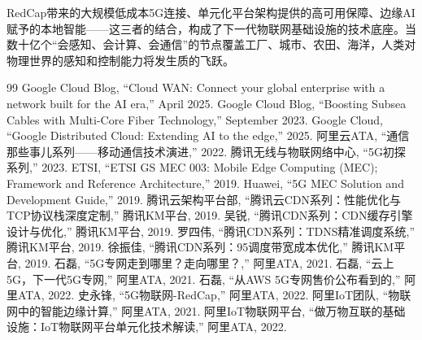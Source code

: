 RedCap带来的大规模低成本5G连接、单元化平台架构提供的高可用保障、边缘AI赋予的本地智能——这三者的结合，构成了下一代物联网基础设施的技术底座。当数十亿个``会感知、会计算、会通信''的节点覆盖工厂、城市、农田、海洋，人类对物理世界的感知和控制能力将发生质的飞跃。

\begin{thebibliography}{99}
 Google Cloud Blog, ``Cloud WAN: Connect your global enterprise with a network built for the AI era,'' April 2025.
 Google Cloud Blog, ``Boosting Subsea Cables with Multi-Core Fiber Technology,'' September 2023.
 Google Cloud, ``Google Distributed Cloud: Extending AI to the edge,'' 2025.
 阿里云ATA, ``通信那些事儿系列——移动通信技术演进,'' 2022.
 腾讯无线与物联网络中心, ``5G初探系列,'' 2023.
 ETSI, ``ETSI GS MEC 003: Mobile Edge Computing (MEC); Framework and Reference Architecture,'' 2019.
 Huawei, ``5G MEC Solution and Development Guide,'' 2019.
 腾讯云架构平台部, ``腾讯云CDN系列：性能优化与TCP协议栈深度定制,'' 腾讯KM平台, 2019.
 吴锐, ``腾讯CDN系列：CDN缓存引擎设计与优化,'' 腾讯KM平台, 2019.
 罗四伟, ``腾讯CDN系列：TDNS精准调度系统,'' 腾讯KM平台, 2019.
 徐振佳, ``腾讯CDN系列：95调度带宽成本优化,'' 腾讯KM平台, 2019.
 石磊, ``5G专网走到哪里？走向哪里？,'' 阿里ATA, 2021.
 石磊, ``云上5G，下一代5G专网,'' 阿里ATA, 2021.
 石磊, ``从AWS 5G专网售价公布看到的,'' 阿里ATA, 2022.
 史永锋, ``5G物联网-RedCap,'' 阿里ATA, 2022.
 阿里IoT团队, ``物联网中的智能边缘计算,'' 阿里ATA, 2021.
 阿里IoT物联网平台, ``做万物互联的基础设施：IoT物联网平台单元化技术解读,'' 阿里ATA, 2022.
\end{thebibliography}
